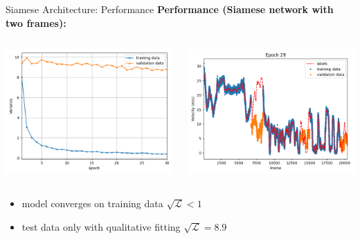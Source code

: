 \begin{frame}{Siamese Architecture: Performance}
	\textbf{Performance (Siamese network with two frames):}
	\begin{columns}[c]
		\begin{column}{0.5\textwidth}
			\includegraphics[width=\textwidth]{imgs/siamese_frames_training.png}
		\end{column}
		\begin{column}{0.5\textwidth}
			\includegraphics[width=\textwidth]{imgs/siamese_frames_performance2.png}
		\end{column}
	\end{columns}
	\begin{itemize}
		\item model converges on training data $\sqrt{\mathcal{L}} < 1$
		\item test data only with qualitative fitting $\sqrt{\mathcal{L}} = 8.9$
	\end{itemize}
\end{frame}

